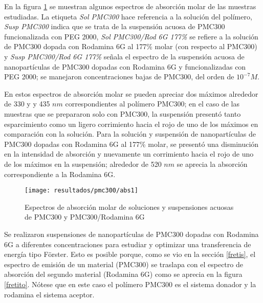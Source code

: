 En la figura \ref{pmc_abs1} se muestran algunos espectros de absorci\'on molar de las muestras estudiadas. La etiqueta \emph{Sol PMC300} hace referencia a la soluci\'on del pol\'imero, \emph{Susp PMC300} indica que se trata de la suspensi\'on acuosa de PMC300 funcionalizada con PEG 2000, \emph{Sol PMC300/Rod 6G 177\%} se refiere a la soluci\'on de PMC300 dopada con Rodamina 6G al 177\% molar (con respecto al PMC300) y \emph{Susp PMC300/Rod 6G 177\%} se\~{n}ala el espectro de la suspensi\'on acuosa de nanopart\'iculas de PMC300 dopadas con Rodamina 6G y funcionalizadas con PEG 2000; se manejaron concentraciones bajas de PMC300, del orden de $10^{-7} M$.

En estos espectros de absorci\'on molar se pueden apreciar dos m\'aximos alrededor de 330 y y 435 $nm$ correspondientes al pol\'imero PMC300; en el caso de las muestras que se prepararon solo con PMC300, la suspensi\'on present\'o tanto esparcimiento como un ligero corrimiento hacia el rojo de uno de los m\'aximos en comparaci\'on con la soluci\'on. Para la soluci\'on y suspensi\'on de nanopart\'iculas de PMC300 dopadas con Rodamina 6G al 177\% molar, se present\'o una disminuci\'on en la intensidad de absorci\'on y nuevamente un corrimiento hacia el rojo de uno de los m\'aximos en la suspensi\'on; alrededor de 520 $nm$ se aprecia la absorci\'on correspondiente a la Rodamina 6G.

\begin{figure}[H]
\centering
\texttt{[image: resultados/pmc300/abs1]}
\caption{Espectros de absorci\'on molar de soluciones y suspensiones acuosas de PMC300 y PMC300/Rodamina 6G}\label{pmc_abs1}
\end{figure}



Se realizaron suspensiones de nanopart\'iculas de PMC300 dopadas con Rodamina 6G a diferentes concentraciones para estudiar y optimizar una transferencia de energ\'ia tipo F\"orster. Esto es posible porque, como se vio en la secci\'on \ref{fretis}, el espectro de emisi\'on de un material (PMC300) se traslapa con el espectro de absorci\'on del segundo material (Rodamina 6G) como se aprecia en la figura \ref{fretito}. N\'otese que en este caso el pol\'imero PMC300 es el sistema donador y la rodamina el sistema aceptor.


